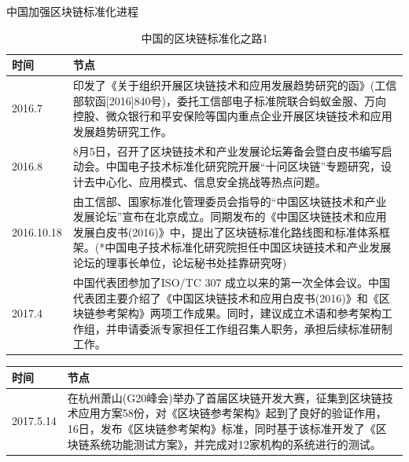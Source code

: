 \documentclass[11pt]{beamer}
\begin{document}
\begin{frame}[allowframebreaks]{中国加强区块链标准化进程}
	\tiny
	\begin{table}[]
		\begin{tabular}{p{}p{}}
			\toprule
			时间       & 节点                                                                                                                                                                                                                                                                          \\ \midrule
			2016.7     & 印发了《关于组织开展区块链技术和应用发展趋势研究的函》(工信部软函{[}2016{]}840号)，委托工信部电子标准院联合蚂蚁金服、万向控股、微众银行和平安保险等国内重点企业开展区块链技术和应用发展趋势研究工作。                                                                         \\
			2016.8     & 8月5日，召开了区块链技术和产业发展论坛筹备会暨白皮书编写启动会。中国电子技术标准化研究院开展“十问区块链”专题研究，设计去中心化、应用模式、信息安全挑战等热点问题。                                                                                                            \\
			2016.10.18 & 由工信部、国家标准化管理委员会指导的“中国区块链技术和产业发展论坛”宣布在北京成立。同期发布的《中国区块链技术和应用发展白皮书(2016)》中，提出了区块链标准化路线图和标准体系框架。(*中国电子技术标准化研究院担任中国区块链技术和产业发展论坛的理事长单位，论坛秘书处挂靠研究呀) \\
			2017.4     & 中国代表团参加了ISO/TC 307 成立以来的第一次全体会议。中国代表团主要介绍了《中国区块链技术和应用白皮书(2016)》和《区块链参考架构》两项工作成果。同时，建议成立术语和参考架构工作组，并申请委派专家担任工作组召集人职务，承担后续标准研制工作。                                 \\
			\bottomrule
		\end{tabular}
		\caption{中国的区块链标准化之路1}
	\end{table}%
	\begin{table}[]
		\begin{tabular}{p{}p{}}
			\toprule
			时间       & 节点                                                                                                                                                                                                                                      \\ \midrule
			2017.5.14  & 在杭州萧山(G20峰会)举办了首届区块链开发大赛，征集到区块链技术应用方案58份，对《区块链参考架构》起到了良好的验证作用，16日，发布《区块链参考架构》标准，同时基于该标准开发了《区块链系统功能测试方案》，并完成对12家机构的系统进行的测试。 \\

\end{tabular}
\end{table}
\end{frame}
\end{document}
